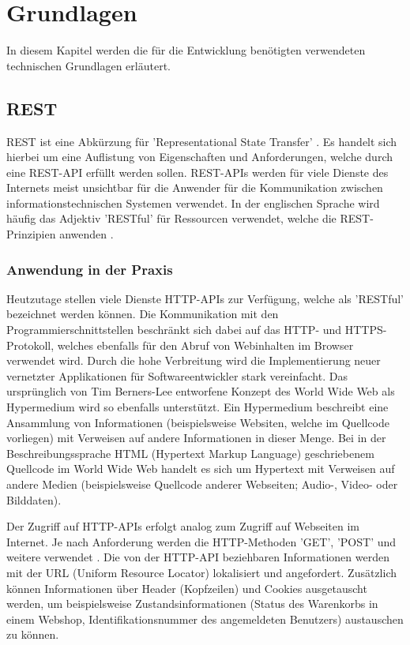 \chapter{Grundlagen}
\label{cha:grundlagen}

In diesem Kapitel werden die für die Entwicklung benötigten verwendeten technischen Grundlagen erläutert.

\section{REST}

REST ist eine Abkürzung für 'Representational State Transfer' \cite[S. 76 ff.]{rest}. Es handelt sich hierbei um eine Auflistung von Eigenschaften und Anforderungen, welche durch eine REST-API erfüllt werden sollen. REST-APIs werden für viele Dienste des Internets meist unsichtbar für die Anwender für die Kommunikation zwischen informationstechnischen Systemen verwendet. In der englischen Sprache wird häufig das Adjektiv 'RESTful' für Ressourcen verwendet, welche die REST-Prinzipien anwenden \cite[S. 277]{swdev}.

\subsection{Anwendung in der Praxis}

Heutzutage stellen viele Dienste HTTP-APIs zur Verfügung, welche als 'RESTful' bezeichnet werden können. Die Kommunikation mit den Programmierschnittstellen beschränkt sich dabei auf das HTTP- und HTTPS-Protokoll, welches ebenfalls für den Abruf von Webinhalten im Browser verwendet wird. Durch die hohe Verbreitung wird die Implementierung neuer vernetzter Applikationen für Softwareentwickler stark vereinfacht. Das ursprünglich von Tim Berners-Lee entworfene Konzept des World Wide Web als Hypermedium wird so ebenfalls unterstützt. Ein Hypermedium beschreibt eine Ansammlung von Informationen (beispielsweise Websiten, welche im Quellcode vorliegen) mit Verweisen auf andere Informationen in dieser Menge. Bei in der Beschreibungssprache HTML (Hypertext Markup Language) geschriebenem Quellcode im World Wide Web handelt es sich um Hypertext mit Verweisen auf andere Medien (beispielsweise Quellcode anderer Webseiten; Audio-, Video- oder Bilddaten). 

Der Zugriff auf HTTP-APIs erfolgt analog zum Zugriff auf Webseiten im Internet. Je nach Anforderung werden die HTTP-Methoden 'GET', 'POST' und weitere verwendet \cite[S. 279]{swdev}. Die von der HTTP-API beziehbaren Informationen werden mit der URL (Uniform Resource Locator) lokalisiert und angefordert. Zusätzlich können Informationen über Header (Kopfzeilen) und Cookies ausgetauscht werden, um beispielsweise Zustandsinformationen (Status des Warenkorbs in einem Webshop, Identifikationsnummer des angemeldeten Benutzers) austauschen zu können.

